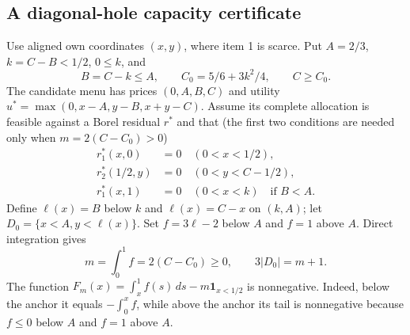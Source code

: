 \subsection{A diagonal-hole capacity certificate}\label{sec:diagonal-support}

Use aligned own coordinates $(x,y)$, where item 1 is scarce. Put $A=2/3$,
$k=C-B<1/2$, $0\le k$, and
\[
 B=C-k\le A,\qquad C_0=5/6+3k^2/4,\qquad C\ge C_0.
\]
The candidate menu has prices $(0,A,B,C)$ and utility
$u^*=\max(0,x-A,y-B,x+y-C)$. Assume its complete allocation is feasible
against a Borel residual $r^*$ and that (the first two conditions are
needed only when $m=2(C-C_0)>0$)
\begin{equation}\label{eq:diagonal-traces}
\begin{split}
r^*_1(x,0)&=0\quad(0<x<1/2),\\
r^*_2(1/2,y)&=0\quad(0<y<C-1/2),\\
r^*_1(x,1)&=0\quad(0<x<k)\quad\text{if }B<A.
\end{split}
\end{equation}
Define $\ell(x)=B$ below $k$ and $\ell(x)=C-x$ on $(k,A)$;
let $D_0=\{x<A,y<\ell(x)\}$. Set $f=3\ell-2$ below $A$ and $f=1$
above $A$. Direct integration gives
\[
m=\int_0^1 f=2(C-C_0)\ge0,\qquad 3|D_0|=m+1.
\]
The function $F_m(x)=\int_x^1f(s)\,ds-m\mathbf1_{x<1/2}$ is nonnegative.
Indeed, below the anchor it equals $-\int_0^x f$, while above the anchor
its tail is nonnegative because $f\le0$ below $A$ and $f=1$ above $A$.

